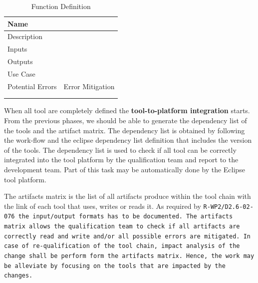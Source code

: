 \begin{table}[htbp]
\centering
\caption{\label{tbl:functions} Function Definition}
\begin{tabular}{|p{5cm}|p{5cm}|}\hline
Name&\\\hline
Description& \\\hline
Inputs & \\\hline
Outputs & \\\hline
Use Case & \\\hline\hline
Potential Errors & Error Mitigation \\\hline
&  \\\hline
&  \\\hline
\end{tabular}
\end{table}




When all tool are completely defined the {\bf tool-to-platform
  integration} starts. From the previous phases, we should be able to generate
the dependency list of the tools and the artifact matrix. The
dependency list is obtained by following the work-flow  and the
eclipse dependency list definition that includes the version of the tools.
The dependency list is used to check if
all tool can be correctly integrated into the tool platform by the
qualification team and report to the development team. Part of this
task may be automatically done by the Eclipse tool platform. 

The artifacts matrix is the list of all artifacts produce within the
tool chain with the link of each tool that uses, writes or reads it. 
As required by \tt{R-WP2/D2.6-02-076} the input/output formats has to
be documented.
The artifacts matrix  allows the qualification team to check if all artifacts are correctly
read and write and/or all possible errors are mitigated.  In case of
re-qualification of the tool chain, impact analysis of the change
shall be perform form the artifacts matrix. Hence,  the work may be
alleviate by focusing on the tools that are impacted by
the changes. 




